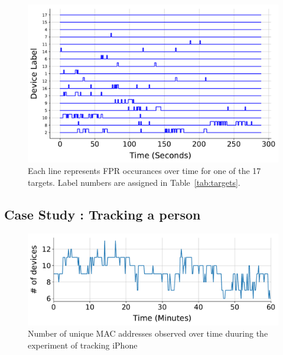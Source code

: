 \begin{figure}[t!]
    \centering
    \includegraphics[width = \linewidth]{plots/fpr_time_10sec_sort.pdf} 
    \caption{Each line represents FPR occurances over time for one of the 17 targets. Label numbers are assigned in Table~\ref{tab:targets}.}
    \label{fig:fpr_time}
\end{figure}










\subsection{Case Study : Tracking a person}
\label{sec:results:case2}

\begin{figure}[t!]
    \centering
    \includegraphics[width = \linewidth]{plots/case_study_iphone_devno.pdf} 
    \caption{Number of unique MAC addresses observed over time duuring the experiment of tracking iPhone}
    \label{fig:iphone_no}
\end{figure}


